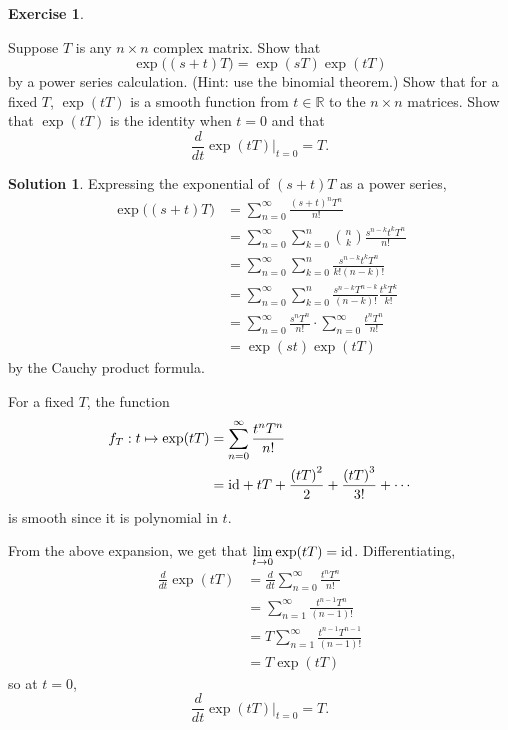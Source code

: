 \documentclass[11pt, a4paper]{report}
\theoremstyle{definition}
\newtheorem{exercise}{Exercise}[part]
\newtheorem{solution}{Solution}[part]
\newenvironment{ex}{\begin{exercise}}{\end{exercise}\pagebreak[1]}
\newenvironment{sol}{\begin{solution}}{\end{solution}\pagebreak[3]}
\newcommand*{\op}[1]{\ensuremath\mathop{}\mathopen{}#1}
\newcommand*{\id}{\op{\mathrm{id}}}
\begin{document}
\begin{ex}\label{ex:exptTidentities}

Suppose $T$ is any $n \times n$ complex matrix. Show that
\[
    \exp\bigl( (s + t) T \bigr) = \exp(sT) \exp(tT)
\]
by a power series calculation. (Hint: use the binomial theorem.)
Show that for a fixed $T$, $\exp(tT)$ is a smooth function from $t \in \mathbb{R}$ to the $n \times n$ matrices.
Show that $\exp(tT)$ is the identity when $t = 0$ and that
\[
    \frac{d}{dt} \exp(tT) \Big|_{t = 0} = T.
\]

\end{ex}

\begin{sol}

Expressing the exponential of $(s + t)T$ as a power series,
\begin{align*}
    \exp\bigl( (s + t) T \bigr) &= \sum_{n = 0}^\infty \frac{{(s + t)}^n T^n}{n!} \\
        &= \sum_{n = 0}^\infty \sum_{k = 0}^n \binom{n}{k} \frac{s^{n - k} t^k T^n}{n!} \\
        &= \sum_{n = 0}^\infty \sum_{k = 0}^n \frac{s^{n - k} t^k T^n}{k! (n - k)!} \\
        &= \sum_{n = 0}^\infty \sum_{k = 0}^n \frac{s^{n - k} T^{n - k}}{(n - k)!} \frac{t^k T^k}{k!} \\
        &= \sum_{n = 0}^\infty \frac{s^n T^n}{n!} \cdot \sum_{n = 0}^\infty \frac{t^n T^n}{n!} \\
        &= \exp(st) \exp(tT)
\end{align*}
by the Cauchy product formula.

For a fixed $T$, the function
\begin{align*}
    f_T: t \mapsto \exp(tT) &= \sum_{n = 0}^\infty \frac{{t^n}T^n}{n!} \\
        &= \id + tT + \frac{{(tT)}^2}{2} + \frac{{(tT)}^3}{3!} + \cdots
\end{align*}
is smooth since it is polynomial in $t$.

From the above expansion, we get that $\displaystyle \lim_{t \to 0} \exp(tT) = \id$.
Differentiating,
\begin{align*}
    \frac{d}{dt} \exp(tT) &= \frac{d}{dt} \sum_{n = 0}^\infty \frac{{t^n}T^n}{n!} \\
        &= \sum_{n = 1}^\infty \frac{t^{n - 1} T^n}{(n - 1)!} \\
        &= T \sum_{n = 1}^\infty \frac{t^{n - 1} T^{n - 1}}{(n - 1)!} \\
        &= T \exp(tT)
\end{align*}
so at $t = 0$,
\[
    \frac{d}{dt} \exp(tT) \Big|_{t = 0} = T.
\]

\end{sol}
\end{document}
